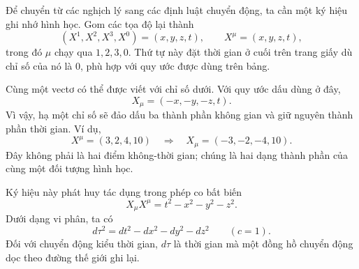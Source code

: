Để chuyển từ các nghịch lý sang các định luật chuyển động, ta cần một ký hiệu ghi nhớ hình học. Gom các tọa độ lại thành
\begin{equation}
(X^1,X^2,X^3,X^0)=(x,y,z,t),
\qquad X^\mu=(x,y,z,t),
\end{equation}
trong đó \(\mu\) chạy qua \(1,2,3,0\). Thứ tự này đặt thời gian ở cuối trên trang giấy dù chỉ số của nó là \(0\), phù hợp với quy ước được dùng trên bảng.

\begin{classroomqa}
\end{classroomqa}

Cùng một vectơ có thể được viết với chỉ số dưới. Với quy ước dấu dùng ở đây,
\begin{equation}
X_\mu=(-x,-y,-z,t).
\end{equation}
Vì vậy, hạ một chỉ số sẽ đảo dấu ba thành phần không gian và giữ nguyên thành phần thời gian. Ví dụ,
\begin{equation}
X^\mu=(3,2,4,10)
\quad\Longrightarrow\quad
X_\mu=(-3,-2,-4,10).
\end{equation}
Đây không phải là hai điểm không-thời gian; chúng là hai dạng thành phần của cùng một đối tượng hình học.

\begin{classroomqa}
\end{classroomqa}

Ký hiệu này phát huy tác dụng trong phép co bất biến
\begin{equation}
X_\mu X^\mu=t^2-x^2-y^2-z^2.
\label{eq:l5-interval}
\end{equation}
Dưới dạng vi phân, ta có
\begin{equation}
d\tau^2=dt^2-dx^2-dy^2-dz^2
\qquad (c=1).
\label{eq:l5-proper-time}
\end{equation}
Đối với chuyển động kiểu thời gian, \(d\tau\) là thời gian mà một đồng hồ chuyển động dọc theo đường thế giới ghi lại.

